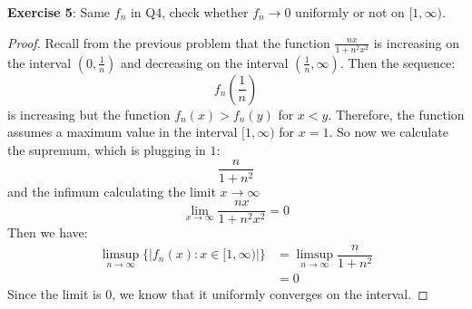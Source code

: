 \documentclass{article}
\begin{document}
\textbf{Exercise 5}: Same $f_{n}$ in Q4, check whether $f_{n} \rightarrow 0$ uniformly or not on $[1, \infty)$.
    \begin{proof}
        Recall from the previous problem that the function $\frac{nx}{1 + n^{2}x^{2}}$ is increasing on the interval $(0, \frac{1}{n})$ and decreasing on the interval $(\frac{1}{n}, \infty)$. Then the sequence:
            \begin{equation*}
                f_{n}(\dfrac{1}{n})
            \end{equation*}
        is increasing but the function $f_{n}(x) > f_{n}(y)$ for $x < y$. Therefore, the function assumes a maximum value in the interval $[1, \infty)$ for $x = 1$. So now we calculate the supremum, which is plugging in $1$:
            \begin{equation*}
                \dfrac{n}{1 + n^{2}}
            \end{equation*}
        and the infimum calculating the limit $x \to \infty$
            \begin{equation*}
                \lim\limits_{x \to \infty}\dfrac{nx}{1 + n^{2}x^{2}} = 0
            \end{equation*}
        Then we have:
            \begin{align*}
                \limsup\limits_{n \to \infty} \{\lvert f_{n}(x) : x \in [1, \infty) \rvert\} &= \limsup\limits_{n \to \infty} \dfrac{n}{1 + n^{2}} \\
                                                                                             &= 0                                                    
            \end{align*}
        Since the limit is $0$, we know that it uniformly converges on the interval.
    \end{proof}
\end{document}
